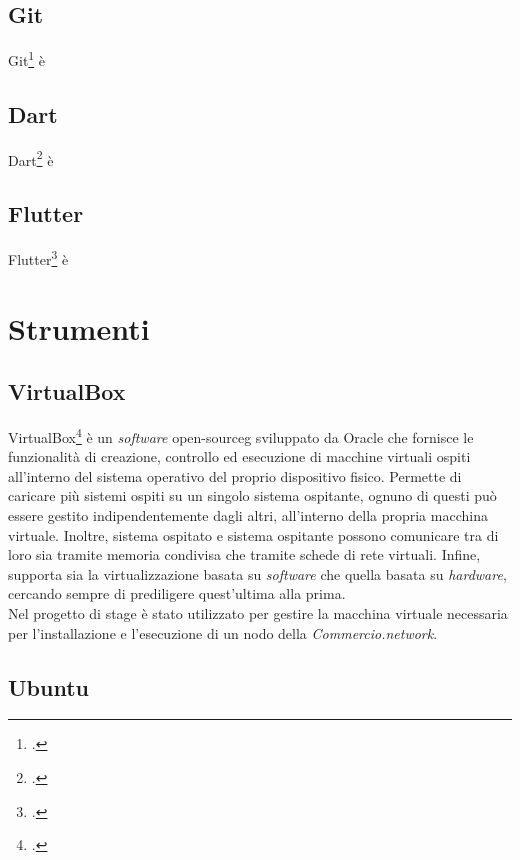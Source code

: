 \subsection*{Git}

Git\footcite{site:git} è

\subsection*{Dart}

Dart\footcite{site:dart} è 

\subsection*{Flutter}

Flutter\footcite{site:flutter} è

\section{Strumenti}
\subsection*{VirtualBox}

VirtualBox\footcite{site:virtual-box} è un \textit{software} \gls{open-sourceg} sviluppato da Oracle che fornisce le funzionalità di creazione, controllo ed esecuzione di macchine virtuali ospiti all'interno del sistema operativo del proprio dispositivo fisico. Permette di caricare più sistemi ospiti su un singolo sistema ospitante, ognuno di questi può essere gestito indipendentemente dagli altri, all'interno della propria macchina virtuale. Inoltre, sistema ospitato e sistema ospitante possono comunicare tra di loro sia tramite memoria condivisa che tramite schede di rete virtuali. Infine, supporta sia la virtualizzazione basata su \textit{software} che quella basata su \textit{hardware}, cercando sempre di prediligere quest'ultima alla prima.\\
Nel progetto di stage è stato utilizzato per gestire la macchina virtuale necessaria per l'installazione e l'esecuzione di un nodo della \textit{Commercio.network}.

\subsection*{Ubuntu}

